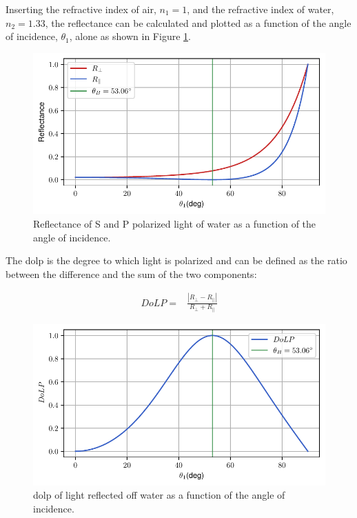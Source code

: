 Inserting the refractive index of air, $n_1 = 1$, and the refractive index of water, $n_2 = 1.33$, the reflectance can be calculated and plotted as a function of the angle of incidence, $\theta_1$, alone as shown in Figure \ref{fig:brewster0}.


\begin{figure}[H]
    \centering
    \includegraphics[width=\textwidth]{figures/pol_plots/brewster0.pdf}
    \caption{Reflectance of S and P polarized light of water as a function of the angle of incidence.}
    \label{fig:brewster0}
\end{figure}

The \gls{dolp} is the degree to which light is polarized and can be defined as the ratio between the difference and the sum of the two components:

\begin{align}
    DoLP= & \frac{\left | R_\perp - R_\parallel \right |}{R_\perp + R_\parallel}
\end{align}
\begin{figure}[H]
    \centering
    \includegraphics[width=\textwidth]{figures/pol_plots/brewster1.pdf}
    \caption{\gls{dolp} of light reflected off water as a function of the angle of incidence.}
    \label{fig:brewster1}
\end{figure}

